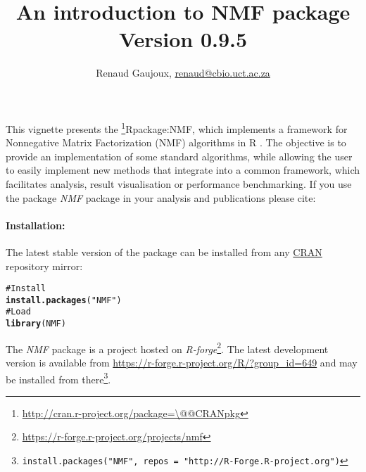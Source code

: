 \documentclass[a4paper]{article}\usepackage{graphicx, color}
\makeatletter
\newcommand{\hlfunctioncall}[1]{\textcolor[rgb]{0.501960784313725,0,0.329411764705882}{\textbf{#1}}}%
\newcommand{\hlstring}[1]{\textcolor[rgb]{0.6,0.6,1}{#1}}%
\newcommand{\hlcomment}[1]{\textcolor[rgb]{0.180392156862745,0.6,0.341176470588235}{#1}}%
\newenvironment{kframe}{%
 \def\at@end@of@kframe{}%
 \ifinner\ifhmode%
  \def\at@end@of@kframe{\end{minipage}}%
  \begin{minipage}{\columnwidth}%
 \fi\fi%
 \def\FrameCommand##1{\hskip\@totalleftmargin \hskip-\fboxsep
 \colorbox{shadecolor}{##1}\hskip-\fboxsep
     \hskip-\linewidth \hskip-\@totalleftmargin \hskip\columnwidth}%
 \MakeFramed {\advance\hsize-\width
   \@totalleftmargin\z@ \linewidth\hsize
   \@setminipage}}%
 {\par\unskip\endMakeFramed%
 \at@end@of@kframe}
\newenvironment{knitrout}{}{} %
\let\code=\texttt
\newcommand{\pkgname}[1]{\textit{#1}\xspace}
\newcommand{\Rpkg}[1]{\pkgname{#1} package\xspace}
\newcommand{\CRANurl}[1]{\url{http://cran.r-project.org/package=#1}}
\def\CRANpkg{\@ifstar\@CRANpkg\@@CRANpkg}
\def\@CRANpkg#1{\href{http://cran.r-project.org/package=#1}{\pkgname{#1}}\footnote{\CRANurl{#1}}}
\def\@@CRANpkg#1{\href{http://cran.r-project.org/package=#1}{\pkgname{#1}} package\footnote{\CRANurl{#1}}}
\def\citeCRANpkg{\@ifstar\@citeCRANpkg\@@citeCRANpkg}
\def\@citeCRANpkg#1{\CRANpkg{#1}\cite*{Rpackage:#1}}
\def\@@citeCRANpkg#1{\CRANpkg{#1}~\cite{Rpackage:#1}}
\newcommand{\nmfpack}{\Rpkg{NMF}}
\renewcommand{\cite}[1]{\parencite{#1}}
\makeatother
\begin{document}




\title{An introduction to NMF package\\\small Version
0.9.5}
\author{Renaud Gaujoux, \url{renaud@cbio.uct.ac.za}}

\maketitle

This vignette presents the \citeCRANpkg{NMF}, which implements a framework
for Nonnegative Matrix Factorization (NMF) algorithms in R \cite{R}.
The objective is to provide an implementation of some standard algorithms, while
allowing the user to easily implement new methods that integrate into a
common framework, which facilitates analysis, result visualisation or
performance benchmarking.
If you use the package \nmfpack in your analysis and publications please cite:

\bigskip
{}

\bigskip
\paragraph{Installation:} The latest stable version of the package can be installed from any
\href{http://cran.r-project.org}{CRAN} repository mirror:
\begin{knitrout}
\color{fgcolor}\begin{kframe}
\begin{alltt}
\hlcomment{# Install}
\hlfunctioncall{install.packages}(\hlstring{"NMF"})
\hlcomment{# Load}
\hlfunctioncall{library}(NMF)
\end{alltt}
\end{kframe}
\end{knitrout}

The \nmfpack is a project hosted on \emph{R-forge}\footnote{\url{https://r-forge.r-project.org/projects/nmf}}.
The latest development version is available from \url{https://r-forge.r-project.org/R/?group_id=649} and may be installed from there\footnote{\code{install.packages("NMF", repos = "http://R-Forge.R-project.org")}}.
\end{document}
